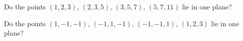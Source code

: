 \begin{frame}
\begin{example}
Do the points $(1, 2, 3)$, $(2, 3, 5)$, $(3, 5, 7)$, $(5, 7, 11)$ lie in one plane?


\end{example}

\begin{example} Do the points $(1,-1,-1)$, $(-1,1,-1)$, $(-1,-1,1)$, $(1,2,3)$ lie in one plane?

\end{example}
\end{frame}